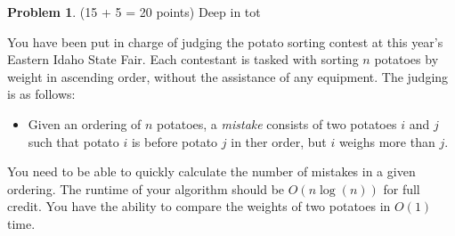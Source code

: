 \documentclass[11pt]{article}
\theoremstyle{definition}
\theoremstyle{theorem}
\newtheorem{prob}{Problem}
\begin{document}
\newpage

\begin{prob}
  \label{prob:potatoes}
(15 + 5 = 20 points) Deep in tot
\end{prob}


\noindent You have been put in charge of judging the potato sorting contest at this year's Eastern Idaho State Fair. Each contestant is tasked with sorting $n$ potatoes by weight in ascending order, without the assistance of any equipment. The judging is as follows:

\begin{itemize}
\item Given an ordering of $n$ potatoes, a \emph{mistake} consists of two potatoes $i$ and $j$ such that potato $i$ is before potato $j$ in ther order, but $i$ weighs more than $j$.
\end{itemize}

You need to be able to quickly calculate the number of mistakes in a given ordering. The runtime of your algorithm should be $O(n \log(n))$ for full credit. You have the ability to compare the weights of two potatoes in $O(1)$ time.
\end{document}
